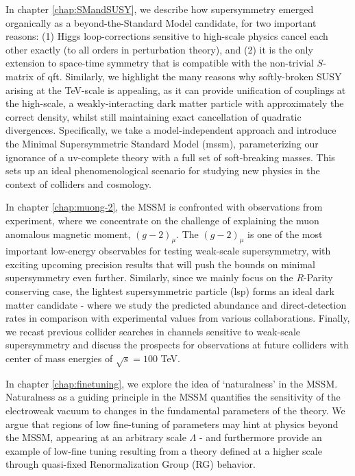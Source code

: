 In chapter \ref{chap:SMandSUSY}, we describe how supersymmetry emerged organically as a beyond-the-Standard Model candidate, for two important reasons: (1) Higgs loop-corrections sensitive to high-scale physics cancel each other exactly (to all orders in perturbation theory), and (2) it is the only extension to space-time symmetry that is compatible with the non-trivial $S$-matrix of \acrshort{qft}. Similarly, we highlight the many reasons why softly-broken SUSY arising at the TeV-scale is appealing, as it can provide unification of couplings at the high-scale, a weakly-interacting dark matter particle with approximately the correct density, whilst still maintaining exact cancellation of quadratic divergences. Specifically, we take a model-independent approach and introduce the Minimal Supersymmetric Standard Model (\acrshort{mssm}), parameterizing our ignorance of a \acrshort{uv}-complete theory with a full set of soft-breaking masses. This sets up an ideal phenomenological scenario for studying new physics in the context of colliders and cosmology.

In chapter \ref{chap:muong-2}, the MSSM is confronted with observations from experiment, where we concentrate on the challenge of explaining the muon anomalous magnetic moment, $(g-2)_{\mu}$. The $(g-2)_{\mu}$ is one of the most important low-energy observables for testing weak-scale supersymmetry, with exciting upcoming precision results that will push the bounds on minimal supersymmetry even further. Similarly, since we mainly focus on the $R$-Parity conserving case, the lightest supersymmetric particle (\acrshort{lsp}) forms an ideal dark matter candidate - where we study the predicted abundance and direct-detection rates in comparison with experimental values from various collaborations. Finally, we recast previous collider searches in channels sensitive to weak-scale supersymmetry and discuss the prospects for observations at future colliders with center of mass energies of $\sqrt{s}=100$ TeV.

In chapter \ref{chap:finetuning}, we explore the idea of `naturalness' in the MSSM. Naturalness as a guiding principle in the MSSM quantifies the sensitivity of the electroweak vacuum to changes in the fundamental parameters of the theory. We argue that regions of low fine-tuning of parameters may hint at physics beyond the MSSM, appearing at an arbitrary scale $\Lambda$ - and furthermore provide an example of low-fine tuning resulting from a theory defined at a higher scale through quasi-fixed Renormalization Group (RG) behavior. 

